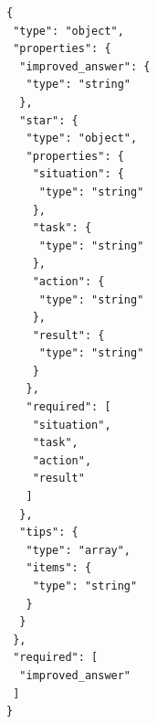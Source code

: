 \begin{lstlisting}[style=adamjson]
{
 "type": "object",
 "properties": {
  "improved_answer": {
   "type": "string"
  },
  "star": {
   "type": "object",
   "properties": {
    "situation": {
     "type": "string"
    },
    "task": {
     "type": "string"
    },
    "action": {
     "type": "string"
    },
    "result": {
     "type": "string"
    }
   },
   "required": [
    "situation",
    "task",
    "action",
    "result"
   ]
  },
  "tips": {
   "type": "array",
   "items": {
    "type": "string"
   }
  }
 },
 "required": [
  "improved_answer"
 ]
}
\end{lstlisting}
